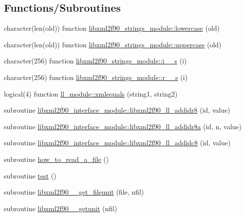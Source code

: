 \subsection*{Functions/\+Subroutines}
\begin{DoxyCompactItemize}
\item 
character(len(old)) function \hyperlink{namespacelibxml2f90__strings__module_a4e91e2d759dc3546b64d31ee3d35e2e7}{libxml2f90\+\_\+strings\+\_\+module\+::lowercase} (old)
\item 
character(len(old)) function \hyperlink{namespacelibxml2f90__strings__module_a9793dff5114e7403d7f95c0b8f493e1d}{libxml2f90\+\_\+strings\+\_\+module\+::uppercase} (old)
\item 
character(256) function \hyperlink{namespacelibxml2f90__strings__module_a1ae9fdac593cf7dfb1239930b06f7151}{libxml2f90\+\_\+strings\+\_\+module\+::i\+\_\+\_\+s} (i)
\item 
character(256) function \hyperlink{namespacelibxml2f90__strings__module_a3e162b5f18f39c8769659ce67d2357a4}{libxml2f90\+\_\+strings\+\_\+module\+::r\+\_\+\_\+s} (i)
\item 
logical(4) function \hyperlink{namespacell__module_a974bd171cab1f518654379cd52246d25}{ll\+\_\+module\+::xmlequals} (string1, string2)
\item 
subroutine \hyperlink{namespacelibxml2f90__interface__module_a74e6744ce3a60bdf75d94db9e9683fa8}{libxml2f90\+\_\+interface\+\_\+module\+::libxml2f90\+\_\+ll\+\_\+addidr8} (id, value)
\item 
subroutine \hyperlink{namespacelibxml2f90__interface__module_a2532faf7ac758a77d95784b4bf95e13d}{libxml2f90\+\_\+interface\+\_\+module\+::libxml2f90\+\_\+ll\+\_\+addidr8a} (id, n, value)
\item 
subroutine \hyperlink{namespacelibxml2f90__interface__module_a3bfde8cab194dab3ca706c4363bd4cf2}{libxml2f90\+\_\+interface\+\_\+module\+::libxml2f90\+\_\+ll\+\_\+addidc8} (id, value)
\item 
subroutine \hyperlink{libxml2f90_8f90__pp_8f90_a5522c3c4e981b0b62e1ddd6f3d77ba44}{how\+\_\+to\+\_\+read\+\_\+a\+\_\+file} ()
\item 
subroutine \hyperlink{libxml2f90_8f90__pp_8f90_a538115974c74d38b05d3ff4d4aa7d712}{test} ()
\item 
subroutine \hyperlink{libxml2f90_8f90__pp_8f90_a43747477c64dd030f8e9dd0cc3ee36ad}{libxml2f90\+\_\+\+\_\+get\+\_\+fileunit} (file, nfil)
\item 
subroutine \hyperlink{libxml2f90_8f90__pp_8f90_a91985cd2da8e09ba96809c73c6fa0286}{libxml2f90\+\_\+\+\_\+getunit} (nfil)

\end{DoxyCompactItemize}
